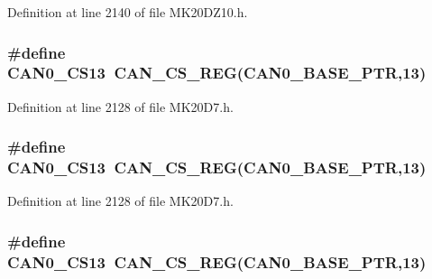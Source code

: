 Definition at line 2140 of file M\+K20\+D\+Z10.\+h.

\subsubsection[{\texorpdfstring{C\+A\+N0\+\_\+\+C\+S13}{CAN0_CS13}}]{\setlength{\rightskip}{0pt plus 5cm}\#define C\+A\+N0\+\_\+\+C\+S13~{\bf C\+A\+N\+\_\+\+C\+S\+\_\+\+R\+EG}({\bf C\+A\+N0\+\_\+\+B\+A\+S\+E\+\_\+\+P\+TR},13)}\hypertarget{group___c_a_n___register___accessor___macros_ga19d6f02c724c92f49bdbd455c0d12ae0}{}\label{group___c_a_n___register___accessor___macros_ga19d6f02c724c92f49bdbd455c0d12ae0}


Definition at line 2128 of file M\+K20\+D7.\+h.

\subsubsection[{\texorpdfstring{C\+A\+N0\+\_\+\+C\+S13}{CAN0_CS13}}]{\setlength{\rightskip}{0pt plus 5cm}\#define C\+A\+N0\+\_\+\+C\+S13~{\bf C\+A\+N\+\_\+\+C\+S\+\_\+\+R\+EG}({\bf C\+A\+N0\+\_\+\+B\+A\+S\+E\+\_\+\+P\+TR},13)}\hypertarget{group___c_a_n___register___accessor___macros_ga19d6f02c724c92f49bdbd455c0d12ae0}{}\label{group___c_a_n___register___accessor___macros_ga19d6f02c724c92f49bdbd455c0d12ae0}


Definition at line 2128 of file M\+K20\+D7.\+h.

\subsubsection[{\texorpdfstring{C\+A\+N0\+\_\+\+C\+S13}{CAN0_CS13}}]{\setlength{\rightskip}{0pt plus 5cm}\#define C\+A\+N0\+\_\+\+C\+S13~{\bf C\+A\+N\+\_\+\+C\+S\+\_\+\+R\+EG}({\bf C\+A\+N0\+\_\+\+B\+A\+S\+E\+\_\+\+P\+TR},13)}\hypertarget{group___c_a_n___register___accessor___macros_ga19d6f02c724c92f49bdbd455c0d12ae0}{}\label{group___c_a_n___register___accessor___macros_ga19d6f02c724c92f49bdbd455c0d12ae0}


